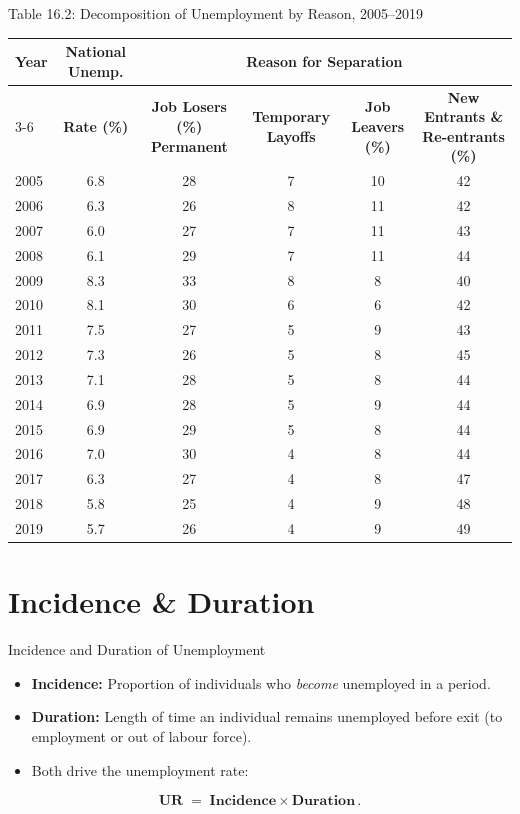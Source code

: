 \documentclass[aspectratio=169]{beamer}
\begin{document}
\begin{frame}{Table 16.2: Decomposition of Unemployment by Reason, 2005--2019}
\transfade
\scriptsize
\begin{tabular}{lccccc}
\toprule
\multirow{2}{*}{\textbf{Year}} & \textbf{National Unemp.} & \multicolumn{4}{c}{\textbf{Reason for Separation}} \\
\cmidrule(lr){3-6}
 & \textbf{Rate (\%)} & \textbf{Job Losers (\%) Permanent} & \textbf{Temporary Layoffs} & \textbf{Job Leavers (\%)} & \textbf{New Entrants \& Re-entrants (\%)} \\
\midrule
2005 & 6.8 & 28 & 7 & 10 & 42 \\
2006 & 6.3 & 26 & 8 & 11 & 42 \\
2007 & 6.0 & 27 & 7 & 11 & 43 \\
2008 & 6.1 & 29 & 7 & 11 & 44 \\
2009 & 8.3 & 33 & 8 & 8 & 40 \\
2010 & 8.1 & 30 & 6 & 6 & 42 \\
2011 & 7.5 & 27 & 5 & 9 & 43 \\
2012 & 7.3 & 26 & 5 & 8 & 45 \\
2013 & 7.1 & 28 & 5 & 8 & 44 \\
2014 & 6.9 & 28 & 5 & 9 & 44 \\
2015 & 6.9 & 29 & 5 & 8 & 44 \\
2016 & 7.0 & 30 & 4 & 8 & 44 \\
2017 & 6.3 & 27 & 4 & 8 & 47 \\
2018 & 5.8 & 25 & 4 & 9 & 48 \\
2019 & 5.7 & 26 & 4 & 9 & 49 \\
\bottomrule
\end{tabular}
\end{frame}

\section{Incidence \& Duration}

\begin{frame}{Incidence and Duration of Unemployment}
\transfade
\begin{itemize}[<+->]
  \item \textbf{Incidence:} Proportion of individuals who \emph{become} unemployed in a period.
  \item \textbf{Duration:} Length of time an individual remains unemployed before exit (to employment or out of labour force).
  \item Both drive the unemployment rate:
\end{itemize}
\[
\textbf{UR} \;=\; \textbf{Incidence} \times \textbf{Duration}\,.
\]
\end{frame}
\end{document}
